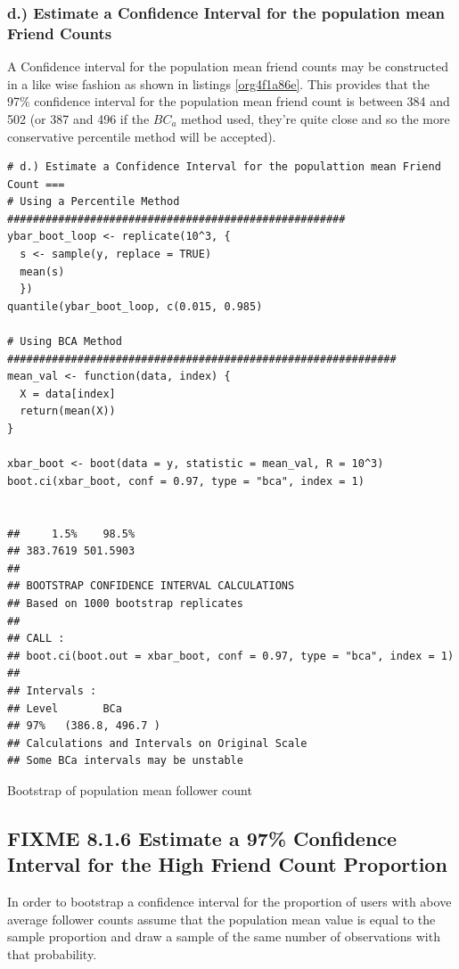 \documentclass[11pt]{article}
\begin{document}
\subsubsection{d.) Estimate a Confidence Interval for the population mean Friend Counts}
\label{sec:orgc66295f}
A Confidence interval for the population mean friend counts may be constructed in a like wise fashion as shown in listings \ref{org4f1a86e}. This provides that the 97\% confidence interval for the population mean friend count is between 384 and 502 (or 387 and 496 if the \(BC_{a}\) method used, they're quite close and so the more conservative percentile method will be accepted).

\begin{listing}[htbp]
\begin{verbatim}
# d.) Estimate a Confidence Interval for the populattion mean Friend Count ===
# Using a Percentile Method #####################################################
ybar_boot_loop <- replicate(10^3, {
  s <- sample(y, replace = TRUE)
  mean(s)
  })
quantile(ybar_boot_loop, c(0.015, 0.985)

# Using BCA Method #############################################################
mean_val <- function(data, index) {
  X = data[index]
  return(mean(X))
}

xbar_boot <- boot(data = y, statistic = mean_val, R = 10^3)
boot.ci(xbar_boot, conf = 0.97, type = "bca", index = 1)


##     1.5%    98.5%
## 383.7619 501.5903
##
## BOOTSTRAP CONFIDENCE INTERVAL CALCULATIONS
## Based on 1000 bootstrap replicates
##
## CALL :
## boot.ci(boot.out = xbar_boot, conf = 0.97, type = "bca", index = 1)
##
## Intervals :
## Level       BCa
## 97%   (386.8, 496.7 )
## Calculations and Intervals on Original Scale
## Some BCa intervals may be unstable
\end{verbatim}
\caption{\label{org4f1a86e}Bootstrap of population mean follower count}
\end{listing}

\subsection{{\bfseries\sffamily FIXME} 8.1.6 Estimate a 97\% Confidence Interval for the High Friend Count Proportion}
\label{sec:orgb237d8c}
In order to bootstrap a confidence interval for the proportion of users with
above average follower counts assume that the population mean value is equal to
the sample proportion and draw a sample of the same number of observations with
that probability.
\end{document}
